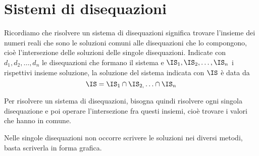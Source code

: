 % 

\section{Sistemi di disequazioni}
\label{sec:diseq_sistemi}

Ricordiamo che risolvere un sistema di disequazioni significa trovare 
l'insieme dei numeri reali che sono le soluzioni comuni alle disequazioni che 
lo compongono, cioè l'intersezione delle soluzioni delle singole 
disequazioni. 
Indicate con \(d_{1}, d_{2}, \ldots, d_n\) le disequazioni che formano 
il sistema e \(\IS_{1}, \IS_{2}, \ldots,\IS_n\) i rispettivi insieme 
soluzione, la soluzione del sistema indicata con \(\IS\) è data da 
\[\IS=\IS_1 \cap \IS_{2,} \ldots \cap \IS_n\]

Per risolvere un sistema di disequazioni, bisogna quindi risolvere ogni 
singola disequazione e poi operare l'intersezione fra questi insiemi, cioè 
trovare i valori che hanno in comune.

\begin{osservazione}
 Nelle singole disequazioni non occorre scrivere le soluzioni nei diversi 
metodi, basta scriverla in forma grafica.
\end{osservazione}

\newpage %

